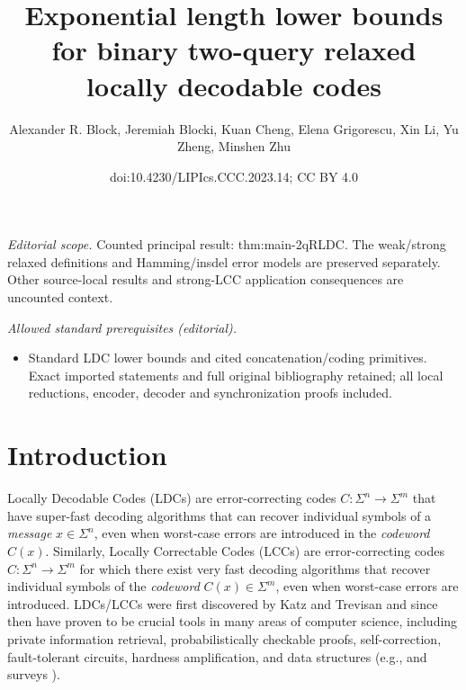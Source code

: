 \documentclass[10pt,a4paper]{article}
\title{Exponential length lower bounds for binary two-query relaxed locally decodable codes}
\author{Alexander R. Block, Jeremiah Blocki, Kuan Cheng, Elena Grigorescu, Xin Li, Yu Zheng, Minshen Zhu}
\date{doi:10.4230/LIPIcs.CCC.2023.14; CC BY 4.0}
\theoremstyle{remark}
\begin{document}
\maketitle
\noindent\textit{Editorial scope.} Counted principal result: thm:main-2qRLDC. The weak/strong relaxed definitions and Hamming/insdel error models are preserved separately. Other source-local results and strong-LCC application consequences are uncounted context.\par\medskip
\noindent\textit{Allowed standard prerequisites (editorial).}\begin{itemize}
\item Standard LDC lower bounds and cited concatenation/coding primitives. Exact imported statements and full original bibliography retained; all local reductions, encoder, decoder and synchronization proofs included.
\end{itemize}\medskip
\section{Introduction}\label{sec:intro}

Locally Decodable Codes (LDCs) \cite{KatzT00, SudanTV99} are error-correcting codes $C: \Sigma^n \rightarrow \Sigma^m$ that have super-fast decoding algorithms that can recover individual symbols of a {\em message} $x\in \Sigma^n$, even when worst-case errors are introduced in the {\em codeword} $C(x)$. Similarly, Locally Correctable Codes (LCCs) are error-correcting codes $C: \Sigma^n \rightarrow \Sigma^m$ for which there exist very fast decoding algorithms that recover individual symbols of the {\em codeword} $C(x)\in \Sigma^m$, even when worst-case errors are introduced. LDCs/LCCs were first discovered by Katz and Trevisan \cite{KatzT00} and since then 
have proven to be crucial tools in many areas of computer science, including private information retrieval, probabilistically checkable proofs, self-correction,  fault-tolerant circuits,  hardness amplification, and data structures (e.g., \cite{BabaiFLS91,LundFKN92,BlumLR93,BlumK95,ChorKGS98,ChenGW13,AndoniLRW17} and surveys \cite{Tre04-survey,Gasarch04}).
\end{document}
